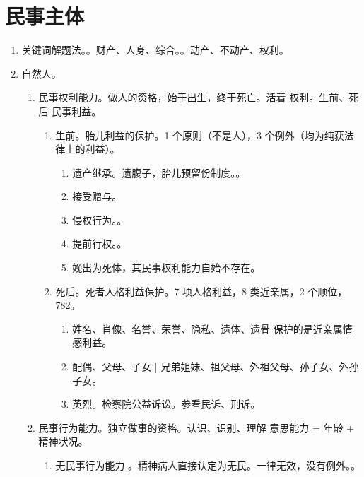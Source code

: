 \section{民事主体}
\begin{enumerate}
  \item 关键词解题法。。财产、人身、综合。\er {}。动产、不动产、权利。
  \item 自然人。
        \begin{enumerate}
          \item 民事权利能力。做人的资格，始于出生，终于死亡。活着 \yjt 权利。生前、死后 \yjt 民事利益。
                \begin{enumerate}
                  \item 生前。胎儿利益的保护。1 个原则（不是人），3 个例外（均为纯获法律上的利益）。
                        \begin{enumerate}
                          \item 遗产继承。遗腹子，胎儿预留份制度。。
                          \item 接受赠与。
                          \item 侵权行为。。
                          \item \sjt 提前行权。。
                          \item 娩出为死体，其民事权利能力自始不存在。
                        \end{enumerate}
                  \item 死后。死者人格利益保护。7 项人格利益，8 类近亲属，2 个顺位，782。
                        \begin{enumerate}
                          \item 姓名、肖像、名誉、荣誉、隐私、遗体、遗骨 \yjt 保护的是近亲属情感利益。
                          \item 配偶、父母、子女 | 兄弟姐妹、祖父母、外祖父母、孙子女、外孙子女。
                          \item 英烈。检察院公益诉讼。参看民诉、刑诉。
                        \end{enumerate}
                \end{enumerate}
          \item 民事行为能力。独立做事的资格。认识、识别、理解 \yjt 意思能力 = 年龄 + 精神状况。
                \begin{enumerate}
                  \item 无民事行为能力 。精神病人直接认定为无民。一律无效，没有例外。。

\end{enumerate}
\end{enumerate}
\end{enumerate}

